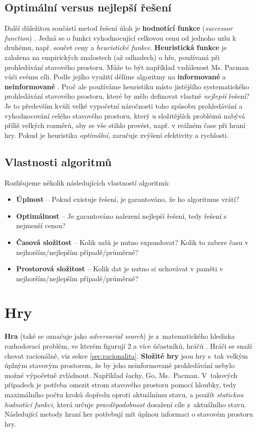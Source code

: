 \subsection*{Optimální versus nejlepší řešení}
Další důležitou součástí metod řešení úloh je \textbf{hodnotící funkce} (\textit{successor function}) \cite{AI1}. Jedná se o funkci vyhodnocující celkovou cenu od jednoho uzlu k druhému, např. součet ceny a \textit{heuristické funkce}.
\textbf{Heuristická funkce} \cite{berkeley} je založena na empirických znalostech (až odhadech) o hře, používaná při prohledávání stavového prostoru. Může to být například vzdálenost Ms. Pacman vůči svému cíli. Podle jejího využití dělíme algoritmy na \textbf{informované} a \textbf{neinformované} \cite{AI1}.
Proč ale používáme heuristiku místo jistějšího systematického prohledávání stavového prostoru, které by mělo definovat vlastně \textit{nejlepší} řešení? Je to především kvůli velké vypočetní náročnosti toho způsobu prohledávání a vyhodnocování celého stavového prostoru, který u složitějších problémů nabývá příliš velkých rozměrů, aby se vše stihlo provést, např. v reálném čase při hraní hry. Pokud je heuristika \textit{optimální}, zaručuje zvýšení efektivity a rychlosti.
\newpage
\subsection*{Vlastnosti algoritmů}
Rozlišujeme několik následujících vlastností algoritmů\cite{AI1}:
\begin{itemize}
\item \textbf{Úplnost} – Pokud existuje řešení, je garantováno, že ho algoritmus vrátí?
\item \textbf{Optimálnost} – Je garantováno nalezení nejlepší řešení, tedy řešení s nejmenší cenou?
\item \textbf{Časová složitost} – Kolik uzlů je nutno expandovat? Kolik to zabere času v nejhorším/nejlepším případě/průměrně?
\item \textbf{Prostorová složitost} – Kolik dat je nutno si uchovávat v paměti v nejhorším/nejlepším případě/průměrně?
\end{itemize}

\section{Hry}
\textbf{Hra} (také se označuje jako \textit{adversarial search}) je z matematického hlediska rozhodovací problém, ve kterém figurují 2 a více účastníků, hráčů \cite{AI1}. Hráči se snaží chovat racionálně, viz sekce \ref{sec:racionalita}.
\newline
\textbf{Složité hry} \cite{AI1} jsou hry s tak velkým úplným stavovým prostorem, že by jeho neinformované prohledávání nebylo možné výpočetně zvládnout. Například šachy, Go, Ms. Pacman. V takových případech je potřeba omezit strom stavového prostoru pomocí hloubky, tedy maximálního počtu kroků dopředu oproti aktuálnímu stavu, a použít \textit{statickou hodnotící funkci}, která určuje \textit{pravděpodobnost} dosažení cíle z aktuálního stavu. Následující metody hraní her potřebují mít úplnou informaci o stavovém prostoru hry.
